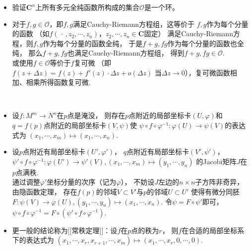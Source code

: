\newcommand{\I}{\operatorname{I}}
\begin{itemize}
    \item[1.]
    验证$\mathbf{C}^n$上所有多元全纯函数所构成的集合$\mathcal{O}$是一个环。

    \item[\textit{Pf:}]
    对于$f,g\in\mathcal{O}$，即$f,g$满足Cauchy-Riemann方程组，这等价于
    $f,g$作为每个分量的函数
    （如$f(\,\cdot\,,z_2,\cdots,z_n)$，$z_2,\cdots,z_n\in\mathbf{C}$固定）
    满足Cauchy-Riemann方程，则$f,g$作为每个分量的函数全纯，
    于是$f+g,fg$作为每个分量的函数也全纯，
    那么$f+g,fg$也满足Cauchy-Riemann方程组，
    得到$f+g,fg\in\mathcal{O}$.\\
    或使用$f\in\mathcal{O}$等价于$f$复可微
    （即$f(z+\Delta z)=f(z)+f'(z)\cdot\Delta z+o(\Delta z)$
    当$\Delta z\rightarrow0$），复可微函数相加、相乘所得函数复可微.

    ~\\
    \item[2.]
    设$f\colon M^m\rightarrow N^n$在$p$点是淹没，
    则存在$p$点附近的局部坐标卡$(U,\varphi)$和
    $q=f(p)$点附近的局部坐标卡$(V,\psi)$使
    $\psi\circ f\circ\varphi^{-1}\colon\varphi(U)\rightarrow\psi(V)$的表达式为
    $(x_1,\cdots,x_m)\mapsto(x_1,\cdots,x_n)$.

    \item[\textit{Pf:}]
    设$p$点附近有局部坐标卡$(U',\varphi')$，
    $q$点附近有局部坐标卡$(V',\psi')$，$\psi'\circ f\circ\varphi^{-1}:
    \varphi(U')\rightarrow\psi'(V),(x_1,\cdots,x_m)\mapsto(y_1,\cdots,y_n)$
    的Jacobi矩阵$J$在$p$点满秩.\\
    通过调整$\varphi'$坐标分量的次序（记为$\varphi$），
    不妨设$J$左边的$n\times n$子方阵非奇异，由隐函数定理，
    存在$f(p)$的邻域$V\subset V'$与$p$的邻域$U\subset U'$
    使得有微分同胚$F\colon\psi(V)\rightarrow\varphi(U),
    (y_1,\cdots,y_n)\mapsto(x_1,\cdots,x_n)$.
    令$\psi=F\circ\psi'$即可，$\psi\circ f\circ\varphi^{-1}
    =F\circ(\psi'\circ f\circ\varphi^{-1})$.

    \item[注：]
    更一般的结论称为[[常秩定理]]：设$f$在$p$点的秩为$r$，
    则$f$在合适的局部坐标系下的表达式为
    $(x_1,\cdots,x_r,x_{r+1},\cdots,x_m)
    \mapsto(x_1,\cdots,x_r,0,\cdots,0)$.


\end{itemize}
